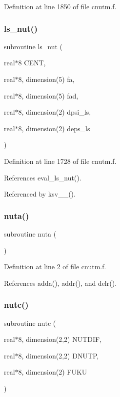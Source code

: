 Definition at line 1850 of file cnutm.\+f.

\mbox{\label{cnutm_8f_ad52f41287720323f63d7b3e5df97341a}} 
\subsubsection{\texorpdfstring{ls\+\_\+nut()}{ls\_nut()}}
{\footnotesize\ttfamily subroutine ls\+\_\+nut (\begin{DoxyParamCaption}\item[{real$\ast$8}]{C\+E\+NT,  }\item[{real$\ast$8, dimension(5)}]{fa,  }\item[{real$\ast$8, dimension(5)}]{fad,  }\item[{real$\ast$8, dimension(2)}]{dpsi\+\_\+ls,  }\item[{real$\ast$8, dimension(2)}]{deps\+\_\+ls }\end{DoxyParamCaption})}



Definition at line 1728 of file cnutm.\+f.



References eval\+\_\+ls\+\_\+nut().



Referenced by ksv\+\_\+\_().

\mbox{\label{cnutm_8f_a90f07365fe0e062ccb9d1f6d5336f048}} 
\subsubsection{\texorpdfstring{nuta()}{nuta()}}
{\footnotesize\ttfamily subroutine nuta (\begin{DoxyParamCaption}{ }\end{DoxyParamCaption})}



Definition at line 2 of file cnutm.\+f.



References adda(), addr(), and delr().

\mbox{\label{cnutm_8f_a3611511346a38c9a7f7d8553b0b80c1e}} 
\subsubsection{\texorpdfstring{nutc()}{nutc()}}
{\footnotesize\ttfamily subroutine nutc (\begin{DoxyParamCaption}\item[{real$\ast$8, dimension(2,2)}]{N\+U\+T\+D\+IF,  }\item[{real$\ast$8, dimension(2,2)}]{D\+N\+U\+TP,  }\item[{real$\ast$8, dimension(2)}]{F\+U\+KU }\end{DoxyParamCaption})}



